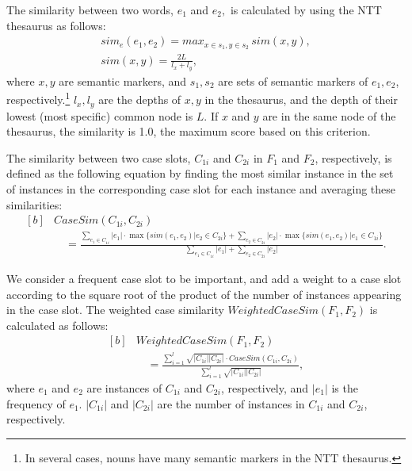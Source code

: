 \documentclass[english]{jnlp_1.4_rep}
\begin{document}
The similarity between two words, $e_1$ and $e_2,$ is calculated by
using the NTT thesaurus \cite{NTT} as follows:
\begin{gather}
 sim_e(e_1, e_2) = max_{x \in s_1, y \in s_2} \, sim(x, y), 
\label{Formula::NttSimilarity} \\
 sim(x, y) = \frac{2L}{l_{x}+l_{y}}, \nonumber
\end{gather}
where $x, y$ are semantic markers, and $s_1, s_2$ are sets of semantic
markers of $e_1, e_2$, respectively.\footnote{In several cases, nouns have
many semantic markers in the NTT thesaurus.} $l_{x}, l_{y}$ are the depths
of $x, y$ in the thesaurus, and the depth of their lowest (most
specific) common node is $L$. If $x$ and $y$ are in the same node of the
thesaurus, the similarity is 1.0, the maximum score based on this
criterion.

The similarity between two case slots, $C_{1i}$ and $C_{2i}$ in $F_1$
and $F_2$, respectively, is defined as the following equation by finding the most
similar instance in the set of instances in the corresponding case slot
for each instance and averaging these similarities:
\begin{equation}
\begin{aligned}[b]
 & CaseSim(C_{1i},C_{2i})  \\
 & \quad =\frac{\sum_{e_1 \in C_{1i}}{\displaystyle |e_1| \cdot \max \{ sim(e_1,e_2) | e_2 \in C_{2i} \}} + 
	\sum_{e_2 \in C_{2i}}{\displaystyle |e_2| \cdot \max \{ sim(e_1,e_2) | e_1 \in C_{1i} \}}}
	{\sum_{e_1 \in C_{1i}}{\displaystyle |e_1|} + \sum_{ e_2 \in C_{2i} }{\displaystyle |e_2|}}.
\end{aligned}
\label{Formula::CaseSimilarity}
\end{equation}

We consider a frequent case slot to be important, and add a weight to a
case slot according to the square root of the product of the number of
instances appearing in the case slot. The weighted case similarity
$\mathit{WeightedCaseSim}(F_1,F_2)$ is calculated as follows:
\begin{equation}
\begin{aligned}[b]
 & \mathit{WeightedCaseSim}(F_1,F_2) \\
 & \quad = \frac
  {
  \sum_{i=1}^{l} \displaystyle \sqrt{|C_{1i}||C_{2i}|} \cdot CaseSim(C_{1i},C_{2i})
  }
  {
  \sum_{i=1}^{l} \displaystyle \sqrt{|C_{1i}||C_{2i}|}
  },
\end{aligned}
\end{equation}
where $e_1$ and $e_2$ are instances of $C_{1i}$ and $C_{2i}$,
respectively, and
$|e_1|$ is the frequency of $e_1$. $|C_{1i}|$ and $|C_{2i}|$ are the
number of instances in $C_{1i}$ and $C_{2i}$, respectively.
\end{document}
